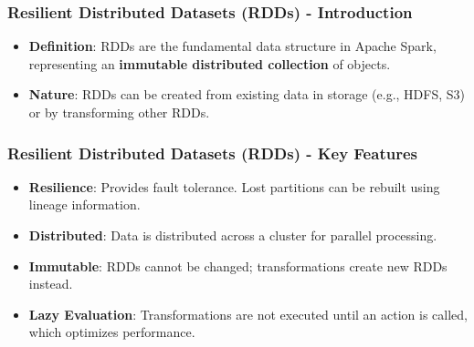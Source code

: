 \documentclass[aspectratio=169]{beamer}
\begin{document}
\begin{frame}[fragile]
    \frametitle{Resilient Distributed Datasets (RDDs) - Introduction}
    \begin{itemize}
        \item \textbf{Definition}: RDDs are the fundamental data structure in Apache Spark, representing an \textbf{immutable distributed collection} of objects.
        \item \textbf{Nature}: RDDs can be created from existing data in storage (e.g., HDFS, S3) or by transforming other RDDs.
    \end{itemize}
\end{frame}

\begin{frame}[fragile]
    \frametitle{Resilient Distributed Datasets (RDDs) - Key Features}
    \begin{itemize}
        \item \textbf{Resilience}: Provides fault tolerance. Lost partitions can be rebuilt using lineage information.
        \item \textbf{Distributed}: Data is distributed across a cluster for parallel processing.
        \item \textbf{Immutable}: RDDs cannot be changed; transformations create new RDDs instead.
        \item \textbf{Lazy Evaluation}: Transformations are not executed until an action is called, which optimizes performance.
    \end{itemize}
\end{frame}
\end{document}
